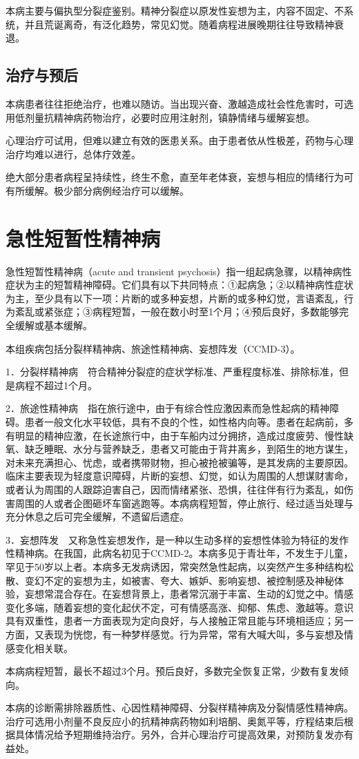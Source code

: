 本病主要与偏执型分裂症鉴别。精神分裂症以原发性妄想为主，内容不固定、不系统，并且荒诞离奇，有泛化趋势，常见幻觉。随着病程进展晚期往往导致精神衰退。

\subsection{治疗与预后}

本病患者往往拒绝治疗，也难以随访。当出现兴奋、激越造成社会性危害时，可选用低剂量抗精神病药物治疗，必要时应用注射剂，镇静情绪与缓解妄想。

心理治疗可试用，但难以建立有效的医患关系。由于患者依从性极差，药物与心理治疗均难以进行，总体疗效差。

绝大部分患者病程呈持续性，终生不愈，直至年老体衰，妄想与相应的情绪行为可有所缓解。极少部分病例经治疗可以缓解。

\section{急性短暂性精神病}

急性短暂性精神病（acute and transient
psychosis）指一组起病急骤，以精神病性症状为主的短暂精神障碍。它们具有以下共同特点：①起病急；②以精神病性症状为主，至少具有以下一项：片断的或多种妄想，片断的或多种幻觉，言语紊乱，行为紊乱或紧张症；③病程短暂，一般在数小时至1个月；④预后良好，多数能够完全缓解或基本缓解。

本组疾病包括分裂样精神病、旅途性精神病、妄想阵发（CCMD-3）。

1．分裂样精神病　符合精神分裂症的症状学标准、严重程度标准、排除标准，但是病程不超过1个月。

2．旅途性精神病　指在旅行途中，由于有综合性应激因素而急性起病的精神障碍。患者一般文化水平较低，具有不良的个性，如性格内向等。患者在起病前，多有明显的精神应激，在长途旅行中，由于车船内过分拥挤，造成过度疲劳、慢性缺氧、缺乏睡眠、水分与营养缺乏，患者又可能由于背井离乡，到陌生的地方谋生，对未来充满担心、忧虑，或者携带财物，担心被抢被骗等，是其发病的主要原因。临床主要表现为轻度意识障碍，片断的妄想、幻觉，如认为周围的人想谋财害命，或者认为周围的人跟踪迫害自己，因而情绪紧张、恐惧，往往伴有行为紊乱，如伤害周围的人或者企图砸坏车窗逃跑等。本病病程短暂，停止旅行、经过适当处理与充分休息之后可完全缓解，不遗留后遗症。

3．妄想阵发　又称急性妄想发作，是一种以生动多样的妄想性体验为特征的发作性精神病。在我国，此病名初见于CCMD-2。本病多见于青壮年，不发生于儿童，罕见于50岁以上者。本病多无发病诱因，常突然急性起病，以突然产生多种结构松散、变幻不定的妄想为主，如被害、夸大、嫉妒、影响妄想、被控制感及神秘体验，妄想常混合存在。在妄想背景上，患者常沉溺于丰富、生动的幻觉之中。情感变化多端，随着妄想的变化起伏不定，可有情感高涨、抑郁、焦虑、激越等。意识具有双重性，患者一方面表现为定向良好，与人接触正常且能与环境相适应；另一方面，又表现为恍惚，有一种梦样感觉。行为异常，常有大喊大叫，多与妄想及情感变化相关联。

本病病程短暂，最长不超过3个月。预后良好，多数完全恢复正常，少数有复发倾向。

本病的诊断需排除器质性、心因性精神障碍、分裂样精神病及分裂情感性精神病。治疗可选用小剂量不良反应小的抗精神病药物如利培酮、奥氮平等，疗程结束后根据具体情况给予短期维持治疗。另外，合并心理治疗可提高效果，对预防复发亦有益处。